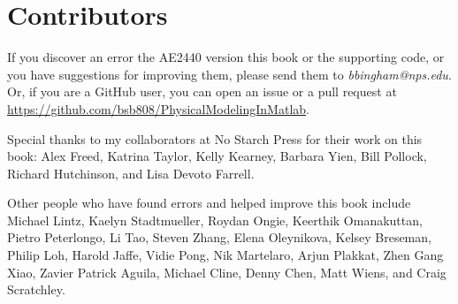 \section*{Contributors}

If you discover an error the AE2440 version this book or the supporting code, or you have suggestions for improving them, please send them to \emph{bbingham@nps.edu}. Or, if you are a GitHub user, you can open an issue or a pull request at \url{https://github.com/bsb808/PhysicalModelingInMatlab}.
    
Special thanks to my collaborators at No Starch Press for their work on this book: Alex Freed, Katrina Taylor, Kelly Kearney, Barbara Yien, Bill Pollock, Richard Hutchinson, and Lisa Devoto Farrell.

Other people who have found errors and helped improve this book include
Michael Lintz,
Kaelyn Stadtmueller,
Roydan Ongie,
Keerthik Omanakuttan,
Pietro Peterlongo,
Li Tao,
Steven Zhang,
Elena Oleynikova,
Kelsey Breseman,
Philip Loh,
Harold Jaffe,
Vidie Pong,
Nik Martelaro,
Arjun Plakkat,
Zhen Gang Xiao,
Zavier Patrick Aguila,
Michael Cline,
Denny Chen,
Matt Wiens,
and Craig Scratchley.

